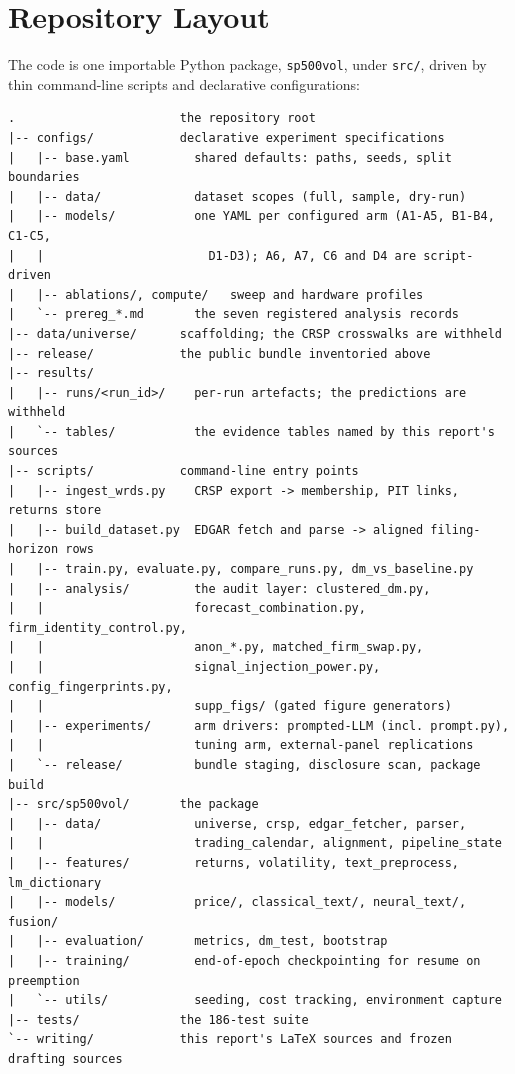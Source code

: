 \clearpage

\FloatBarrier
\section{Repository Layout}
\label{app:external:layout}

The code is one importable Python package, \texttt{sp500vol}, under
\texttt{src/}, driven by thin command-line scripts and declarative
configurations:

\begin{verbatim}
.                       the repository root
|-- configs/            declarative experiment specifications
|   |-- base.yaml         shared defaults: paths, seeds, split boundaries
|   |-- data/             dataset scopes (full, sample, dry-run)
|   |-- models/           one YAML per configured arm (A1-A5, B1-B4, C1-C5,
|   |                       D1-D3); A6, A7, C6 and D4 are script-driven
|   |-- ablations/, compute/   sweep and hardware profiles
|   `-- prereg_*.md       the seven registered analysis records
|-- data/universe/      scaffolding; the CRSP crosswalks are withheld
|-- release/            the public bundle inventoried above
|-- results/
|   |-- runs/<run_id>/    per-run artefacts; the predictions are withheld
|   `-- tables/           the evidence tables named by this report's sources
|-- scripts/            command-line entry points
|   |-- ingest_wrds.py    CRSP export -> membership, PIT links, returns store
|   |-- build_dataset.py  EDGAR fetch and parse -> aligned filing-horizon rows
|   |-- train.py, evaluate.py, compare_runs.py, dm_vs_baseline.py
|   |-- analysis/         the audit layer: clustered_dm.py,
|   |                     forecast_combination.py, firm_identity_control.py,
|   |                     anon_*.py, matched_firm_swap.py,
|   |                     signal_injection_power.py, config_fingerprints.py,
|   |                     supp_figs/ (gated figure generators)
|   |-- experiments/      arm drivers: prompted-LLM (incl. prompt.py),
|   |                     tuning arm, external-panel replications
|   `-- release/          bundle staging, disclosure scan, package build
|-- src/sp500vol/       the package
|   |-- data/             universe, crsp, edgar_fetcher, parser,
|   |                     trading_calendar, alignment, pipeline_state
|   |-- features/         returns, volatility, text_preprocess, lm_dictionary
|   |-- models/           price/, classical_text/, neural_text/, fusion/
|   |-- evaluation/       metrics, dm_test, bootstrap
|   |-- training/         end-of-epoch checkpointing for resume on preemption
|   `-- utils/            seeding, cost tracking, environment capture
|-- tests/              the 186-test suite
`-- writing/            this report's LaTeX sources and frozen drafting sources
\end{verbatim}

